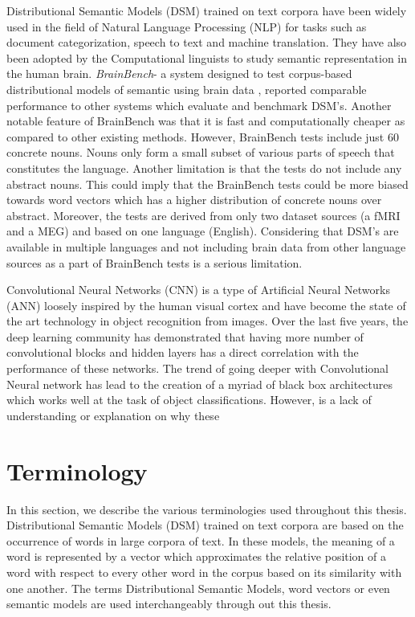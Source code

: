 Distributional Semantic Models (DSM) trained on text corpora have been widely used in the field of Natural Language Processing (NLP) for tasks such as document categorization, speech to text and machine translation. They have also been adopted by the Computational linguists to study semantic representation in the human brain. \textit{BrainBench}- a system designed to test corpus-based distributional models of semantic using brain data \cite{BrainBench2016}, reported comparable performance to other systems which evaluate and benchmark DSM's. Another notable feature of BrainBench was that it is fast and computationally cheaper as compared to other existing methods. However, BrainBench tests include just 60 concrete nouns.  Nouns only form a small subset of various parts of speech that constitutes the language. Another limitation is that the tests do not include any abstract nouns. This could imply that the BrainBench tests could be more biased towards word vectors which has a higher distribution of concrete nouns over abstract. Moreover, the tests are derived from only two dataset sources (a fMRI and a MEG) and based on one language (English). Considering that DSM's are available in multiple languages and not including brain data from other language sources as a part of BrainBench tests is a serious limitation.

Convolutional Neural Networks (CNN) is a type of Artificial Neural Networks (ANN) loosely inspired by the human visual cortex and have become the state of the art technology in object recognition from images. Over the last five years, the deep learning community has demonstrated that having more number of convolutional blocks and hidden layers has a direct correlation with the performance of these networks. The trend of going deeper with Convolutional Neural network has lead to the creation of a myriad of black box architectures which works well at the task of object classifications. However, is a lack of understanding or explanation on why these 

 


\section{Terminology}

In this section, we describe the various terminologies used throughout this thesis. Distributional Semantic Models (DSM) trained on text corpora are based on the occurrence of words in large corpora of text. In these models, the meaning of a word is represented by a vector which approximates the relative position of a word with respect to every other word in the corpus based on its similarity with one another. The terms Distributional Semantic Models, word vectors or even semantic models are used interchangeably through out this thesis.

